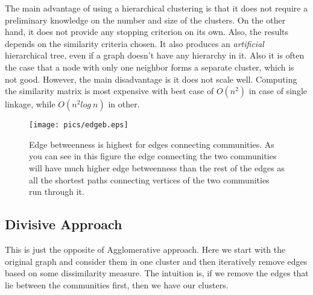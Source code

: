 \documentclass[letterpaper]{article}
\begin{document}
The main advantage of using a hierarchical clustering is that it does not
require a preliminary knowledge on the number and size of the clusters. On the
other hand, it does not provide any stopping criterion on its own. Also, the
results depends on the similarity criteria chosen. It also produces an
\emph{artificial} hierarchical tree, even if a graph doesn't have any hierarchy
in it. Also it is often the case that a node with only one neighbor forms a
separate cluster, which is not good. However, the main disadvantage is it does
not scale well.  Computing the similarity matrix is most expensive with best
case of $O(n^2)$ in case of single linkage, while $O(n^2 log\ n)$ in other.


\begin{figure}
\texttt{[image: pics/edgeb.eps]}
\caption{Edge betweenness is highest for edges connecting communities. As you
can see in this figure the edge connecting the two communities will have much
higher edge betweenness than the rest of the edges as all the shortest paths
connecting vertices of the two communities run through it.} \label{fig:edge}
\end{figure}

\subsection{Divisive Approach}
This is just the opposite of Agglomerative approach. Here we start with the
original graph and consider them in one cluster and then iteratively remove
edges based on some dissimilarity measure. The intuition is, if we remove the
edges that lie between the communities first, then we have our clusters.
\end{document}
